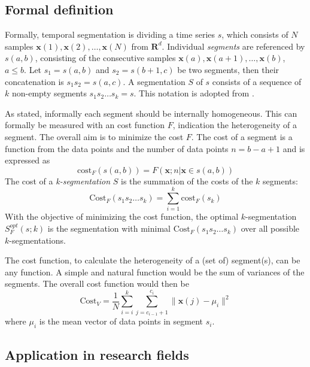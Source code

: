 \subsection{Formal definition}
Formally, temporal segmentation is dividing a time series $s$, which consists 
of $N$ samples $\mathbf{x}(1),\mathbf{x}(2),\dots,\mathbf{x}(N)$ from 
$\mathbf{R}^d$. Individual \emph{segments} are referenced by $s(a,b)$, 
consisting of the consecutive samples 
$\mathbf{x}(a),\mathbf{x}(a+1),\dots,\mathbf{x}(b)$, $a \le b$. Let $s_1 = 
s(a,b)$ and $s_2 = s(b+1,c)$ be two segments, then their concatenation is 
$s_1s_2 = s(a,c)$. A segmentation $S$ of $s$ consists of a sequence of $k$ 
non-empty segments $s_1s_2 \dots s_k = s$.
This notation is adopted from \cite{himberg2001time}.

As stated, informally each segment should be internally homogeneous. This can 
formally be measured with an cost function $F$, indication the heterogeneity 
of a segment. The overall aim is to minimize the cost $F$. The cost of a 
segment is a function from the data points and the number of data points $n = 
b - a + 1$ and is expressed as
\begin{equation} \label{eq:segment_cost}
\mathrm{cost}_F (s(a,b)) = F(\mathbf{x};n|\mathbf{x} \in s(a,b))
\end{equation}
The cost of a \emph{k-segmentation} $S$ is the summation of the costs of the 
$k$ segments:
\begin{equation} \label{eq:segmentation_cost}
\mathrm{Cost}_F (s_1 s_2 \dots s_k) = \sum_{i=1}^{k} \mathrm{cost}_F (s_k)
\end{equation}
With the objective of minimizing the cost function, the optimal 
$k$-segmentation $S_F^\mathit{opt}(s;k)$ is the segmentation with minimal 
$\mathrm{Cost}_F(s_1 s_2 \dots s_k)$ over all possible $k$-segmentations.

The cost function, to calculate the heterogeneity of a (set of) segment(s), 
can 
be any function. A simple and natural function would be the sum of variances 
of the segments. The overall cost function would then be
\begin{equation} \label{eq:cost_variances}
\mathrm{Cost}_V = \frac{1}{N} \sum_{i=i}^{k} \sum_{j=c_{i-1}+1}^{c_i} \| 
\mathbf{x}(j) - \mu_i \|^2
\end{equation} 
where $\mu_i$ is the mean vector of data points in segment $s_i$.

\subsection{Application in research fields}

